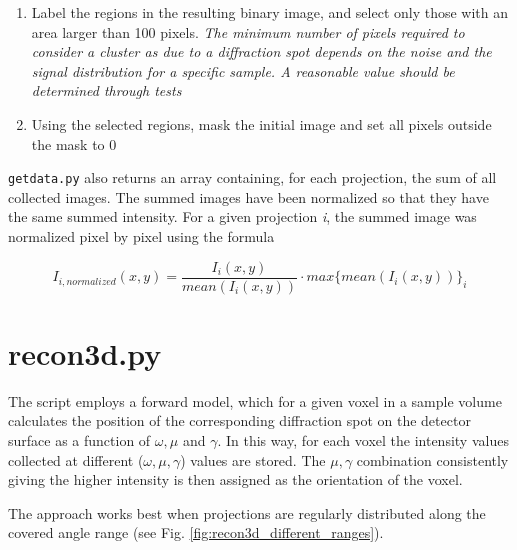 \documentclass[11pt]{scrartcl}
\begin{document}
\begin{enumerate}
\begin{enumerate}
        \item Label the regions in the resulting binary image, and select only those with an area larger than 100 pixels. {\emph{The minimum number of pixels required to consider a cluster as due to a diffraction spot depends on the noise and the signal distribution for a specific sample. A reasonable value should be determined through tests}}
        
        \item Using the selected regions, mask the initial image and set all pixels outside the mask to 0
    \end{enumerate}
    
\end{enumerate}

{\texttt{getdata.py}} also returns an array containing, for each projection, the sum of all collected images. The summed images have been normalized so that they have the same summed intensity. For a given projection {\emph{i}}, the summed image was normalized pixel by pixel using the formula

\begin{equation}
    I_{i,normalized}(x,y) = \frac{I_i(x,y)}{mean(I_i(x,y))} \cdot max\{mean(I_i(x,y))\}_i
\end{equation}

\section{recon3d.py}

The script employs a forward model, which for a given voxel in a sample volume calculates the position of the corresponding diffraction spot on the detector surface as a function of $\omega, \mu$ and $\gamma$. In this way, for each voxel the intensity values collected at different ($\omega, \mu, \gamma$) values are stored. The $\mu, \gamma$ combination consistently giving the higher intensity is then assigned as the orientation of the voxel. 

The approach works best when projections are regularly distributed along the covered angle range (see Fig. \ref{fig:recon3d_different_ranges}).
\end{document}
